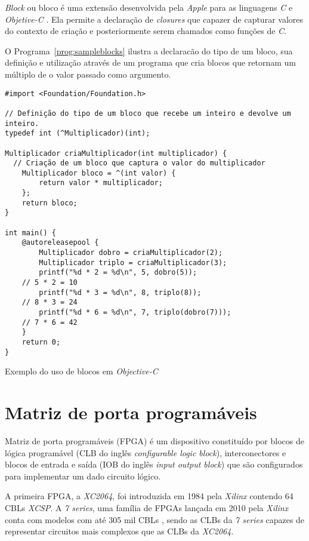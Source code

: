 \emph{Block} ou bloco é uma extensão desenvolvida pela \emph{Apple} para as linguagens
\emph{C} e \emph{Objetive-C} \citep{Blocos}. Ela permite a declaração de \emph{closures} que capazer
de capturar valores do contexto de criação e posteriormente serem chamados como funções
de \emph{C}.

O Programa~\ref{prog:sampleblocks} ilustra a declaracão do tipo de um bloco, sua definição e utilização
através de um programa que cria blocos que retornam um múltiplo de o valor passado como argumento.

\begin{program}
  \centering

\lstset{language=[Objective]C}
\begin{lstlisting}[style=wider]
#import <Foundation/Foundation.h>

// Definição do tipo de um bloco que recebe um inteiro e devolve um inteiro.
typedef int (^Multiplicador)(int);

Multiplicador criaMultiplicador(int multiplicador) {
  // Criação de um bloco que captura o valor do multiplicador
	Multiplicador bloco = ^(int valor) {
		return valor * multiplicador;
	};
	return bloco;
}

int main() {
	@autoreleasepool {
		Multiplicador dobro = criaMultiplicador(2);
		Multiplicador triplo = criaMultiplicador(3);
		printf("%d * 2 = %d\n", 5, dobro(5));
    // 5 * 2 = 10
		printf("%d * 3 = %d\n", 8, triplo(8));
    // 8 * 3 = 24
		printf("%d * 6 = %d\n", 7, triplo(dobro(7)));
    // 7 * 6 = 42
	}
	return 0;
}
\end{lstlisting}

  \caption{Exemplo do uso de blocos em \emph{Objective-C}\label{prog:sampleblocks}}
\end{program}

\newpage
\section{Matriz de porta programáveis}
\label{sec:FPGA}

Matriz de porta programáveis (FPGA) é um 
dispositivo constituído por blocos de lógica programável (CLB do inglês 
\emph{configurable logic block}), interconectores e blocos de entrada e saída 
(IOB do inglês \emph{input output block}) que são configurados para implementar um dado
circuito lógico.

A primeira FPGA, a \emph{XC2064}, foi introduzida em 1984 pela \emph{Xilinx} \citep{8392473}
contendo 64 CBLs \emph{XCSP}. A \emph{7 series}, uma família de FPGAs lançada em 2010 pela \emph{Xilinx} 
\citep{S7LN} conta com modelos com até 305 mil CBLs \citep{7CLB}, sendo as CLBs da \emph{7 series}
capazes de representar circuitos mais complexos que as CLBs da \emph{XC2064}.

